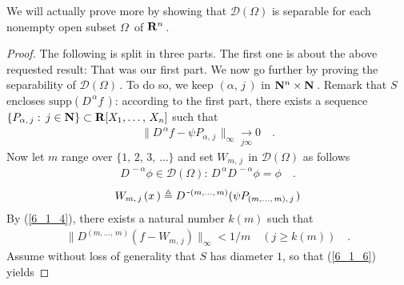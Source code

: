 We will actually prove more by showing that $\mathscr{D}(\Omega)$ is separable for each nonempty open subset $\Omega\,$ of ${\mathbf R}^n\,$. 
\begin{proof}
The following is split in three parts. The first one is about the above requested result: %
That was our first part. We now go further by proving the separability of $\mathscr{D}(\Omega)\,$. To do so, we keep $(\alpha,\, j\,)$ in ${\mathbf N}^n\times {\mathbf N}\,$. Remark that $S$ encloses $\text{supp}(D^{\, \alpha}f\,) $: according to the first part, there exists a sequence $\{ P_{\alpha,\, j}:\, j\in {\mathbf N} \}  \subset{\mathbf R} [X_1,\dotsc ,\, X_n]$ such that 
\begin{align}\label{6_1_4}
\|  D^{\, \alpha} f-  \psi P_{\alpha,\, j \,} \|_\infty \underset{j\infty}{\longrightarrow} 0 \quad . 
\end{align}
Now let $m$ range over $\{1,\, 2,\,3,\, \dots\}$ and set $W_{m,\, j\,}$ in $\mathscr{D}(\Omega)$ as follows
\begin{align}\label{6_1_5a}
D^{\,\minus \alpha} \phi \in \mathscr{D}(\Omega):\, D^{\,\alpha} D^{\,\minus \alpha} \phi= \phi\quad .
\end{align}
\begin{align}\label{6_1_5}
W_{m,\, j\,}(x\,)\triangleq D^{\,\text{\small{-}} (m,\dotsc,\,m)} ( \psi P_{(m,\dotsc, \, m),\, j\,})
                                                          \end{align}
By (\ref{6_1_4}), there exists a natural number $k(\!m)$ such that 
\begin{align}\label{6_1_6}
\|D^{(m,\dotsc,\, m)} (f   -W_{m,\, j})   \|_\infty < 1/m  \quad (j\geq k(\!m) )\quad  .
\end{align}
 Assume without loss of generality that $S$ has diameter $1$, so that (\ref{6_1_6}) yields

\end{proof}
